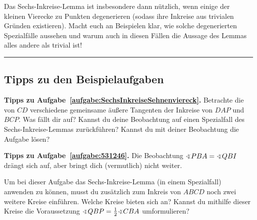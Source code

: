 Das Sechs-Inkreise-Lemma ist insbesondere dann nützlich, wenn einige der kleinen Vierecke zu Punkten degenerieren (sodass ihre Inkreise aus trivialen Gründen existieren). Macht euch an Beispielen klar, wie solche degenerierten Spezialfälle aussehen und warum auch in diesen Fällen die Aussage des Lemmas alles andere als trivial ist!

\vfill\hrule\vspace{-1em}

\subsection*{Tipps zu den Beispielaufgaben}
\textbf{Tipps zu Aufgabe~\ref{aufgabe:SechsInkreiseSehnenviereck}.} Betrachte die von $CD$ verschiedene gemeinsame äußere Tangenten der Inkreise von $DAP$ und $BCP$. Was fällt dir auf? Kannst du deine Beobachtung auf einen Spezialfall des Sechs-Inkreise-Lemmas zurückführen? Kannst du mit deiner Beobachtung die Aufgabe lösen?

\textbf{Tipps zu Aufgabe~\ref{aufgabe:531246}.} Die Beobachtung $\winkel PBA=\winkel QBI$ drängt sich auf, aber bringt dich (vermutlich) nicht weiter.

Um bei dieser Aufgabe das Sechs-Inkreise-Lemma (in einem Spezialfall) anwenden zu können, musst du zusätzlich zum Inkreis von $ABCD$ noch zwei weitere Kreise einführen. Welche Kreise bieten sich an? Kannst du mithilfe dieser Kreise die Voraussetzung $\winkel QBP=\frac12\winkel CBA$ umformulieren?